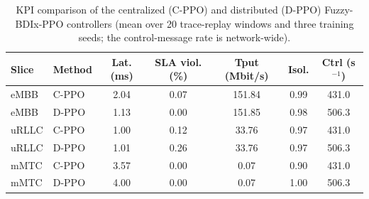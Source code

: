 \begin{table}[!t]
\centering
\caption{KPI comparison of the centralized (C-PPO) and distributed (D-PPO) Fuzzy-BDIx-PPO controllers (mean over 20 trace-replay windows and three training seeds; the control-message rate is network-wide).}
\label{tab:kpi_comparison}
\footnotesize
\begin{tabular}{llccccc}
\toprule
\textbf{Slice} & \textbf{Method} & \textbf{Lat. (ms)} & \textbf{SLA viol. (\%)} & \textbf{Tput (Mbit/s)} & \textbf{Isol.} & \textbf{Ctrl (s$^{-1}$)} \\
\midrule
eMBB & C-PPO & 2.04 & 0.07 & 151.84 & 0.99 & 431.0 \\
eMBB & D-PPO & 1.13 & 0.00 & 151.85 & 0.98 & 506.3 \\
uRLLC & C-PPO & 1.00 & 0.12 & 33.76 & 0.97 & 431.0 \\
uRLLC & D-PPO & 1.01 & 0.26 & 33.76 & 0.97 & 506.3 \\
mMTC & C-PPO & 3.57 & 0.00 & 0.07 & 0.90 & 431.0 \\
mMTC & D-PPO & 4.00 & 0.00 & 0.07 & 1.00 & 506.3 \\
\bottomrule
\end{tabular}
\end{table}
